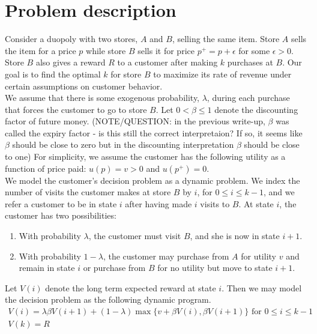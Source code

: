 \documentclass[12pt, a4paper]{article}
\begin{document}


\section{Problem description}
Consider a duopoly with two stores, $A$ and $B$, selling the same item. Store $A$ sells the item for a price $p$ while store $B$ sells it for price $p^{+} = p+\epsilon$ for some $\epsilon > 0$. Store $B$ also gives a reward $R$ to a customer after making $k$ purchases at $B$. Our goal is to find the optimal $k$ for store $B$ to maximize its rate of revenue under certain assumptions on customer behavior. \\

We assume that there is some exogenous probability, $\lambda$, during each purchase that forces the customer to go to store $B$. Let $0 < \beta \leq 1$ denote the discounting factor of future money. (NOTE/QUESTION: in the previous write-up, $\beta$ was called the expiry factor - is this still the correct interpretaion? If so, it seems like $\beta$ should be close to zero but in the discounting interpretation $\beta$ should be close to one) For simplicity, we assume the customer has the following utility as a function of price paid: $u(p) = v > 0$ and $u(p^+) = 0$. \\

We model the customer's decision problem as a dynamic problem. We index the number of visits the customer makes at store $B$ by $i$, for $0 \leq i \leq k-1$, and we refer a customer to be in state $i$ after having made $i$ visits to $B$. At state $i$, the customer has two possibilities:
\begin{enumerate}
\item
With probability $\lambda$, the customer must visit $B$, and she is now in state $i+1$.
\item
With probability $1-\lambda$, the customer may purchase from $A$ for utility $v$ and remain in state $i$ or purchase from $B$ for no utility but move to state $i+1$.
\end{enumerate}

Let $V(i)$ denote the long term expected reward at state $i$. Then we may model the decision problem as the following dynamic program.
\begin{gather*}
V(i) = \lambda \beta V(i+1) + (1-\lambda)\max\{v+\beta V(i),\beta V(i+1) \} \mbox{ for } 0\leq i \leq k-1 \\
V(k) = R
\end{gather*}
\end{document}
